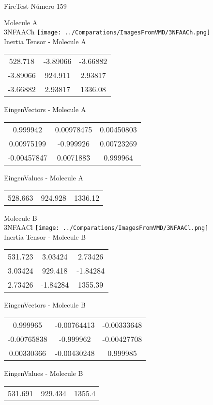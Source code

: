 \vtab[-2cm]
\begin{center}
{\large FireTest \tab Número 159}
\end{center}
\begin{multicols}{2}
\begin{center}

Molecule A \\ 
3NFAACh
\texttt{[image: ../Comparations/ImagesFromVMD/3NFAACh.png]}
\\
Inertia Tensor - Molecule A \\
\vtab

\begin{tabular}{|c c c|}
528.718	 & 	-3.89066	 & 	-3.66882	 \\
-3.89066	 & 	924.911	 & 	2.93817	 \\
-3.66882	 & 	2.93817	 & 	1336.08
\end{tabular}

\vtab
 EingenVectors - Molecule A     \\
\vtab
\begin{tabular}{|c c c|}
0.999942	 & 	0.00978475	 & 	0.00450803	 \\
0.00975199	 & 	-0.999926	 & 	0.00723269	 \\
-0.00457847	 & 	0.0071883	 & 	0.999964
\end{tabular}

\vtab
 EingenValues - Molecule A     \\
\vtab
\begin{tabular}{|c c c|}
528.663	 & 	924.928	 & 	1336.12	 \\
\end{tabular}
\columnbreak

Molecule B \\ 
3NFAACl
\texttt{[image: ../Comparations/ImagesFromVMD/3NFAACl.png]}
\\
Inertia Tensor - Molecule B \\
\vtab

\begin{tabular}{|c c c|}
531.723	 & 	3.03424	 & 	2.73426	 \\
3.03424	 & 	929.418	 & 	-1.84284	 \\
2.73426	 & 	-1.84284	 & 	1355.39
\end{tabular}

\vtab
 EingenVectors - Molecule B     \\
\vtab
\begin{tabular}{|c c c|}
0.999965	 & 	-0.00764413	 & 	-0.00333648	 \\
-0.00765838	 & 	-0.999962	 & 	-0.00427708	 \\
0.00330366	 & 	-0.00430248	 & 	0.999985
\end{tabular}

\vtab
 EingenValues - Molecule B     \\
\vtab
\begin{tabular}{|c c c|}
531.691	 & 	929.434	 & 	1355.4	 \\
\end{tabular}

\end{center}
\end{multicols}
